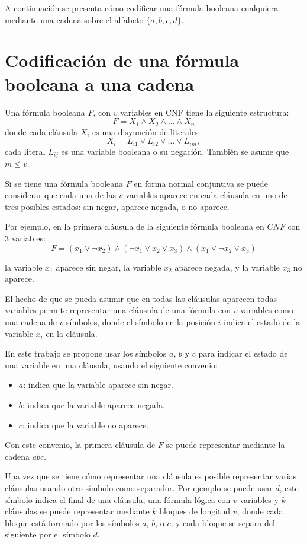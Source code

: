 A continuación se presenta cómo codificar una fórmula booleana cualquiera mediante una cadena sobre el alfabeto $\{a,b,c,d\}$.

\section{Codificación de una fórmula booleana a una cadena}
\label{sec:codsat}

Una fórmula booleana $F$, con $v$ variables en CNF tiene la siguiente estructura:
$$F=X_1 \wedge X_2 \wedge \ldots \wedge X_n$$
donde cada cláusula $X_i$ es una disyunción de literales
$$X_i=L_{i1} \vee L_{i2} \vee \ldots \vee L_{im},$$
cada literal $L_{ij}$ es una variable booleana o su negación. También se asume que $m\leq v$. 

Si se tiene una fórmula booleana $F$ en forma normal conjuntiva se puede considerar que cada una de las $v$ variables aparece en cada cláusula en uno de tres posibles estados: sin negar, aparece negada, o no aparece.

Por ejemplo, en la primera cláusula de la siguiente fórmula booleana en $CNF$ con 3 variables:
$$F=(x_1 \vee \neg x_2) \wedge (\neg x_1 \vee x_2 \vee x_3) \wedge (x_1 \vee \neg x_2 \vee x_3)$$

la variable $x_1$ aparece sin negar, la variable $x_2$ aparece negada, y la variable $x_{3}$ no aparece.

El hecho de que se pueda asumir que en todas las cláusulas aparecen todas variables permite representar una cláusula de una fórmula con $v$ variables como una cadena de $v$ símbolos, donde el símbolo en la posición $i$ indica el estado de la variable $x_i$ en la cláusula.

En este trabajo se propone usar los símbolos $a$, $b$ y $c$ para indicar el estado de una variable en una cláusula, usando el siguiente convenio:

\begin{itemize}
    \item $a$: indica que la variable aparece sin negar.
    \item $b$: indica que la variable aparece negada.
    \item $c$: indica que la variable no aparece.
\end{itemize}

Con este convenio, la primera cláusula de $F$ se puede representar mediante la cadena $abc$.

Una vez que se tiene cómo representar una cláusula es posible representar varias cláusulas usando otro símbolo como separador.
Por ejemplo se puede usar $d$, este símbolo indica el final de una cláusula, una fórmula lógica con $v$ variables y $k$ cláusulas se puede representar mediante $k$ bloques de longitud $v$, donde cada bloque está formado por los símbolos $a$, $b$, o $c$, y cada bloque se separa del siguiente por el símbolo $d$.

